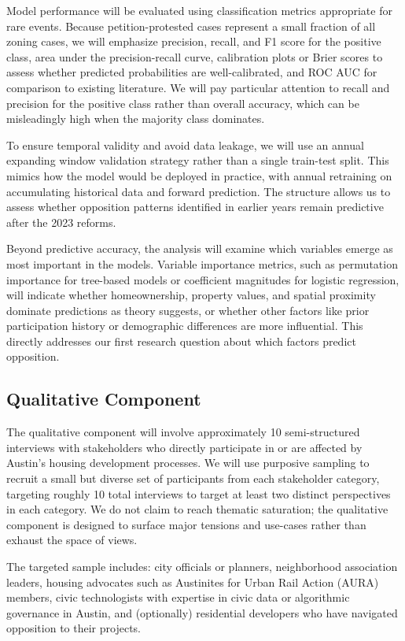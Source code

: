 \documentclass[12pt]{article}
\begin{document}
Model performance will be evaluated using classification metrics appropriate for rare events. Because petition-protested cases represent a small fraction of all zoning cases, we will emphasize precision, recall, and F1 score for the positive class, area under the precision-recall curve, calibration plots or Brier scores to assess whether predicted probabilities are well-calibrated, and ROC AUC for comparison to existing literature. We will pay particular attention to recall and precision for the positive class rather than overall accuracy, which can be misleadingly high when the majority class dominates.

To ensure temporal validity and avoid data leakage, we will use an annual expanding window validation strategy rather than a single train-test split. This mimics how the model would be deployed in practice, with annual retraining on accumulating historical data and forward prediction. The structure allows us to assess whether opposition patterns identified in earlier years remain predictive after the 2023 reforms.

Beyond predictive accuracy, the analysis will examine which variables emerge as most important in the models. Variable importance metrics, such as permutation importance for tree-based models or coefficient magnitudes for logistic regression, will indicate whether homeownership, property values, and spatial proximity dominate predictions as theory suggests, or whether other factors like prior participation history or demographic differences are more influential. This directly addresses our first research question about which factors predict opposition.

\subsection{Qualitative Component}

The qualitative component will involve approximately 10 semi-structured interviews with stakeholders who directly participate in or are affected by Austin's housing development processes. We will use purposive sampling to recruit a small but diverse set of participants from each stakeholder category, targeting roughly 10 total interviews to target at least two distinct perspectives in each category. We do not claim to reach thematic saturation; the qualitative component is designed to surface major tensions and use-cases rather than exhaust the space of views.

The targeted sample includes: city officials or planners, neighborhood association leaders, housing advocates such as Austinites for Urban Rail Action (AURA) members, civic technologists with expertise in civic data or algorithmic governance in Austin, and (optionally) residential developers who have navigated opposition to their projects.
\end{document}
